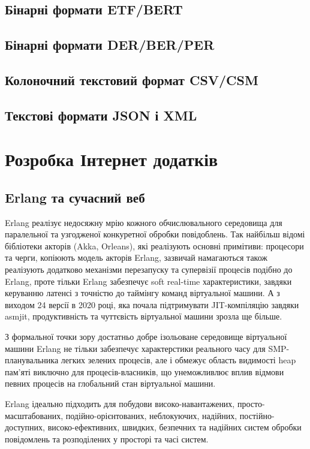 \subsection{Бінарні формати ETF/BERT}

\subsection{Бінарні формати DER/BER/PER}

\subsection{Колоночний текстовий формат CSV/CSM}

\subsection{Текстові формати JSON і XML}

\newpage
\section{Розробка Інтернет додатків}

\subsection{Erlang та сучасний веб}

Erlang реалізує недосяжну мрію кожного обчислювального середовища для
паралельної та узгодженої конкуретної обробки повідоблень. Так найбільш
відомі бібліотеки акторів (Akka, Orleans), які реалізують основні примітиви:
процесори та черги, копіюють модель акторів Erlang, зазвичай намагаються
також реалізують додатково механізми перезапуску та супервізії процесів
подібно до Erlang, проте тільки Erlang забезпечує soft real-time характеристики,
завдяки керуванню латенсі з точністю до таймінгу команд віртуальної машини.
А з виходом 24 версії в 2020 році, яка почала підтримувати JIT-компіляцію
завдяки asmjit, продуктивність та чуттєвість віртуальної машини зрозла
ще більше.

З формальної точки зору достатньо добре ізольоване середовище віртуальної
машини Erlang не тільки забезпечує характерстики реального часу для
SMP-планувальника легких зелених процесів, але і обмежує область видимості
heap пам'яті виключно для процесів-власників, що унеможливлює вплив відмови
певних процесів на глобальний стан віртуальної машини.

Erlang ідеально підходить для побудови високо-навантажених,
просто-масштабованих, подійно-орієнтованих, неблокуючих, надійних,
постійно-доступних, високо-ефективних, швидких, безпечних та надійних
систем обробки повідомлень та розподілених у просторі та часі систем.

